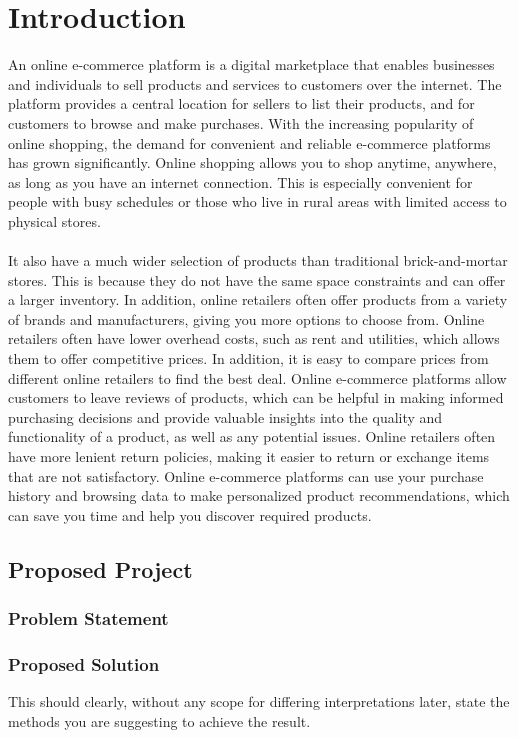 \documentclass[11pt]{report}
\begin{document}
\chapter {Introduction}
\label{intro}
An online e-commerce platform is a digital marketplace that enables businesses and individuals to sell products and services to customers over the internet. The platform provides a central location for sellers to list their products, and for customers to browse and make purchases. With the increasing popularity of online shopping, the demand for convenient and reliable e-commerce platforms has grown significantly. Online shopping allows you to shop anytime, anywhere, as long as you have an internet connection. This is especially convenient for people with busy schedules or those who live in rural areas with limited access to physical stores.\\
\\It also have a much wider selection of products than traditional brick-and-mortar stores. This is because they do not have the same space constraints and can offer a larger inventory. In addition, online retailers often offer products from a variety of brands and manufacturers, giving you more options to choose from. Online retailers often have lower overhead costs, such as rent and utilities, which allows them to offer competitive prices. In addition, it is easy to compare prices from different online retailers to find the best deal. Online e-commerce platforms allow customers to leave reviews of products, which can be helpful in making informed purchasing decisions and provide valuable insights into the quality and functionality of a product, as well as any potential issues. Online retailers often have more lenient return policies, making it easier to return or exchange items that are not satisfactory.  Online e-commerce platforms can use your purchase history and browsing data to make personalized product recommendations, which can save you time and help you discover required products.


\section{Proposed Project}
\subsection{\label{ps}Problem Statement}

\subsection{Proposed Solution}
This should clearly, without any scope for differing interpretations later, state the methods you are suggesting to achieve the result.
\end{document}
